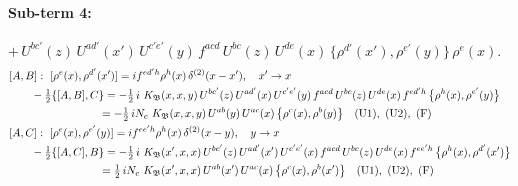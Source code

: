 \documentclass[10pt]{article}
\numberwithin{equation}{section}
\begin{document}
\paragraph{Sub-term 4:} $+\,U^{bc'}(z)\,U^{ad'}(x')\,U^{c'e'}(y)\,f^{acd}\,U^{bc}(z)\,U^{de}(x)\,\big\{\rho^{d'}(x'),\rho^{e'}(y)\big\}\,\rho^{e}(x)$.
\begin{align}
&[A,B]:\ [\rho^{e}(x),\rho^{d'}(x')]=i f^{ed'h}\rho^{h}(x)\,\delta^{(2)}(x-x'),\quad x'\to x\notag\\
&\qquad -\tfrac12\{[A,B],C\}=-\tfrac12\,i\,\,K_{\mathfrak B}(x,x,y)\,U^{bc'}(z)\,U^{ad'}(x)\,U^{c'e'}(y)\,f^{acd}\,U^{bc}(z)\,U^{de}(x)\,f^{ed'h}\,\big\{\rho^{h}(x),\rho^{e'}(y)\big\}\notag\\
&\qquad\phantom{-\tfrac12\{[A,B],C\}}=-\tfrac12\,i N_{c}\,\,K_{\mathfrak B}(x,x,y)\,U^{ab}(y)\,U^{ac}(x)\,\big\{\rho^{c}(x),\rho^{b}(y)\big\}\quad\text{(U1)},\ \text{(U2)},\ \text{(F)}
\label{eq:GII.I1-4-AB}\\
&[A,C]:\ [\rho^{e}(x),\rho^{e'}(y)]=i f^{ee'h}\rho^{h}(x)\,\delta^{(2)}(x-y),\quad y\to x\notag\\
&\qquad -\tfrac12\{[A,C],B\}=-\tfrac12\,i\,\,K_{\mathfrak B}(x',x,x)\,U^{bc'}(z)\,U^{ad'}(x')\,U^{c'e'}(x)\,f^{acd}\,U^{bc}(z)\,U^{de}(x)\,f^{ee'h}\,\big\{\rho^{h}(x),\rho^{d'}(x')\big\}\notag\\
&\qquad\phantom{-\tfrac12\{[A,C],B\}}=\tfrac12\,i N_{c}\,\,K_{\mathfrak B}(x',x,x)\,U^{ab}(x')\,U^{ac}(x)\,\big\{\rho^{c}(x),\rho^{b}(x')\big\}\quad\text{(U1)},\ \text{(U2)},\ \text{(F)}
\label{eq:GII.I1-4-AC}
\end{align}
\end{document}
